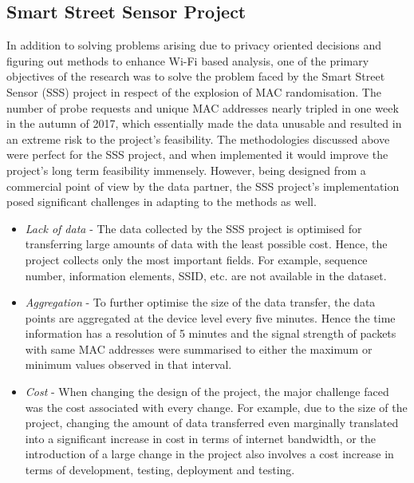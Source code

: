\subsection{Smart Street Sensor Project}
In addition to solving problems arising due to privacy oriented decisions and figuring out methods to enhance Wi-Fi based analysis, one of the primary objectives of the research was to solve the problem faced by the Smart Street Sensor (SSS) project in respect of the explosion of MAC randomisation.
The number of probe requests and unique MAC addresses nearly tripled in one week in the autumn of 2017, which essentially made the data unusable and resulted in an extreme risk to the project’s feasibility.
The methodologies discussed above were perfect for the SSS project, and when implemented it would improve the project’s long term feasibility immensely.
However, being designed from a commercial point of view by the data partner, the SSS project’s implementation posed significant challenges in adapting to the methods as well.

\begin{itemize}
  \item \textit{Lack of data} - The data collected by the SSS project is optimised for transferring large amounts of data with the least possible cost. Hence, the project collects only the most important fields. For example, sequence number, information elements, SSID, etc. are not available in the dataset. 
  \item \textit{Aggregation} - To further optimise the size of the data transfer, the data points are aggregated at the device level every five minutes. Hence the time information has a resolution of 5 minutes and the signal strength of packets with same MAC addresses were summarised to either the maximum or minimum values observed in that interval.
  \item \textit{Cost} - When changing the design of the project, the major challenge faced was the cost associated with every change. For example, due to the size of the project, changing the amount of data transferred even marginally translated into a significant  increase in cost in terms of internet bandwidth, or the introduction of a large change in the project also involves a cost increase in terms of development, testing, deployment and testing.
\end{itemize}

